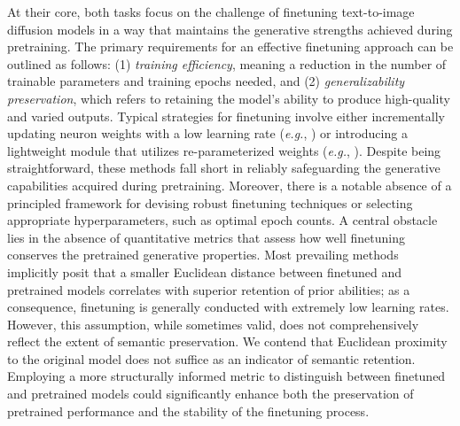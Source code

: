At their core, both tasks focus on the challenge of finetuning text-to-image diffusion models in a way that maintains the generative strengths achieved during pretraining. The primary requirements for an effective finetuning approach can be outlined as follows: (1) \emph{training efficiency}, meaning a reduction in the number of trainable parameters and training epochs needed, and (2) \emph{generalizability preservation}, which refers to retaining the model’s ability to produce high-quality and varied outputs. Typical strategies for finetuning involve either incrementally updating neuron weights with a low learning rate (\emph{e.g.}, \cite{ruiz2023dreambooth}) or introducing a lightweight module that utilizes re-parameterized weights (\emph{e.g.}, \cite{hulora2022,zhang2023adding}). Despite being straightforward, these methods fall short in reliably safeguarding the generative capabilities acquired during pretraining. Moreover, there is a notable absence of a principled framework for devising robust finetuning techniques or selecting appropriate hyperparameters, such as optimal epoch counts. A central obstacle lies in the absence of quantitative metrics that assess how well finetuning conserves the pretrained generative properties. Most prevailing methods implicitly posit that a smaller Euclidean distance between finetuned and pretrained models correlates with superior retention of prior abilities; as a consequence, finetuning is generally conducted with extremely low learning rates. However, this assumption, while sometimes valid, does not comprehensively reflect the extent of semantic preservation. We contend that Euclidean proximity to the original model does not suffice as an indicator of semantic retention. Employing a more structurally informed metric to distinguish between finetuned and pretrained models could significantly enhance both the preservation of pretrained performance and the stability of the finetuning process.

